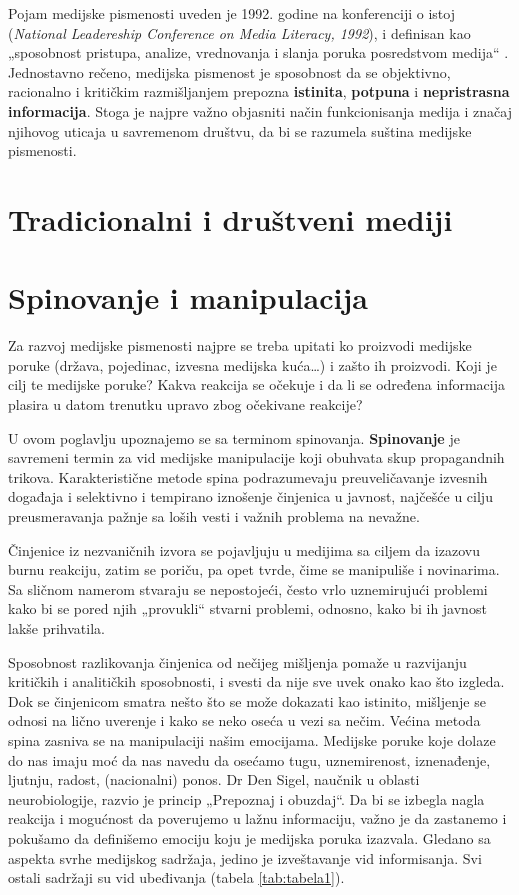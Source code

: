 \documentclass[a4paper]{article}
\begin{document}
Pojam medijske pismenosti uveden je 1992. godine na konferenciji o istoj (\emph{National Leadereship Conference on Media Literacy, 1992}), i definisan kao „sposobnost pristupa, analize, vrednovanja i slanja poruka posredstvom medija“ . Jednostavno rečeno, medijska pismenost je sposobnost da se objektivno, racionalno i kritičkim razmišljanjem prepozna \textbf{istinita}, \textbf{potpuna} i \textbf{nepristrasna informacija}.  
Stoga je najpre važno objasniti način funkcionisanja medija i značaj njihovog uticaja u savremenom društvu, da bi se razumela suština medijske pismenosti.

\newpage

\section{Tradicionalni i društveni mediji}

\section{Spinovanje i manipulacija}
\label{sec:naslovN}


Za razvoj medijske pismenosti najpre se treba upitati ko proizvodi medijske poruke (država, pojedinac, izvesna medijska kuća…) i zašto ih proizvodi. Koji je cilj te medijske poruke? Kakva reakcija se očekuje i da li se određena informacija plasira u datom trenutku upravo zbog očekivane reakcije? 

 	U ovom poglavlju upoznajemo se sa terminom spinovanja.\textbf{ Spinovanje} je savremeni termin za vid medijske manipulacije koji obuhvata skup propagandnih trikova. Karakteristične metode spina podrazumevaju preuveličavanje izvesnih događaja i selektivno i tempirano iznošenje činjenica u javnost, najčešće u cilju preusmeravanja pažnje sa loših vesti i važnih problema na nevažne.

Činjenice iz nezvaničnih izvora se pojavljuju u medijima sa ciljem da izazovu burnu reakciju, zatim se poriču, pa opet tvrde, čime se manipuliše i novinarima. Sa sličnom namerom stvaraju se nepostojeći, često vrlo uznemirujući problemi kako bi se pored njih „provukli“ stvarni problemi, odnosno, kako bi ih javnost lakše prihvatila. 

Sposobnost razlikovanja činjenica od nečijeg mišljenja pomaže u razvijanju kritičkih i analitičkih sposobnosti, i svesti da nije sve uvek onako kao što izgleda. Dok se činjenicom smatra nešto što se može dokazati kao istinito, mišljenje se odnosi na lično uverenje i kako se neko oseća u vezi sa nečim. 
Većina metoda spina zasniva se na manipulaciji našim emocijama. Medijske poruke koje dolaze do nas imaju moć da nas navedu da osećamo tugu, uznemirenost, iznenađenje, ljutnju, radost, (nacionalni) ponos. Dr Den Sigel, naučnik u oblasti neurobiologije, razvio je princip „Prepoznaj i obuzdaj“. Da bi se izbegla nagla reakcija i mogućnost da poverujemo u lažnu informaciju, važno je da zastanemo i pokušamo da definišemo emociju koju je medijska poruka izazvala. Gledano sa aspekta svrhe medijskog sadržaja, jedino je izveštavanje vid informisanja. Svi ostali sadržaji su vid ubeđivanja (tabela \ref{tab:tabela1}). 
\end{document}
